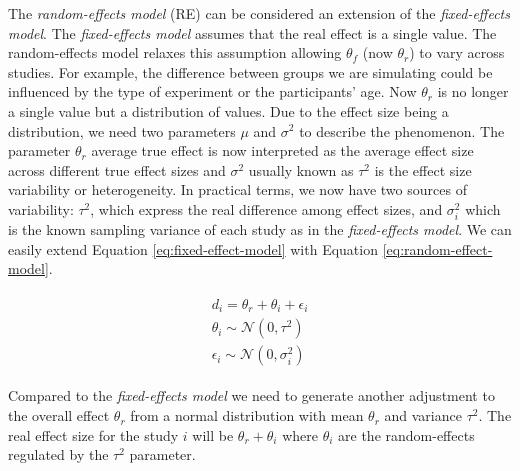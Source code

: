 \documentclass[
  man,floatsintext]{apa6}
\begin{document}
The \emph{random-effects model} (RE) can be considered an extension of the \emph{fixed-effects model}. The \emph{fixed-effects model} assumes that the real effect is a single value. The random-effects model relaxes this assumption allowing \(\theta_{f}\) (now \(\theta_{r}\)) to vary across studies. For example, the difference between groups we are simulating could be influenced by the type of experiment or the participants' age.
Now \(\theta_{r}\) is no longer a single value but a distribution of values. Due to the effect size being a distribution, we need two parameters \(\mu\) and \(\sigma^{2}\) to describe the phenomenon. The parameter \(\theta_{r}\) average true effect is now interpreted as the average effect size across different true effect sizes and \(\sigma^{2}\) usually known as \(\tau^{2}\) is the effect size variability or heterogeneity. In practical terms, we now have two sources of variability: \(\tau^{2}\), which express the real difference among effect sizes, and \(\sigma_{i}^{2}\) which is the known sampling variance of each study as in the \emph{fixed-effects model}. We can easily extend Equation \eqref{eq:fixed-effect-model} with Equation \eqref{eq:random-effect-model}.

\begin{align}
\begin{aligned}
d_i = \theta_r + \theta_i + \epsilon_i \\
\theta_i \sim \mathcal{N}(0, \tau^2) \\
\epsilon_i \sim \mathcal{N}(0,\sigma^2_i)
\label{eq:random-effect-model}
\end{aligned}
\end{align}

Compared to the \emph{fixed-effects model} we need to generate another adjustment to the overall effect \(\theta_{r}\) from a normal distribution with mean \(\theta_{r}\) and variance \(\tau^{2}\). The real effect size for the study \(i\) will be \(\theta_{r} + \theta_{i}\) where \(\theta_{i}\) are the random-effects regulated by the \(\tau^{2}\) parameter.

\scriptsize
\end{document}
